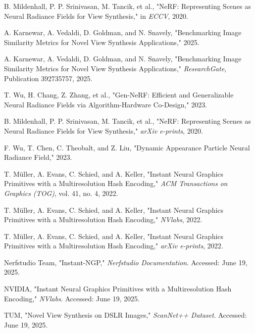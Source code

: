 \documentclass[11pt]{article}
\begin{document}
\newpage
\begin{thebibliography}{99}

B. Mildenhall, P. P. Srinivasan, M. Tancik, et al., "NeRF: Representing Scenes as Neural Radiance Fields for View Synthesis," in \textit{ECCV}, 2020.

A. Karnewar, A. Vedaldi, D. Goldman, and N. Snavely, "Benchmarking Image Similarity Metrics for Novel View Synthesis Applications," 2025.

A. Karnewar, A. Vedaldi, D. Goldman, and N. Snavely, "Benchmarking Image Similarity Metrics for Novel View Synthesis Applications," \textit{ResearchGate}, Publication 392735757, 2025.

T. Wu, H. Chang, Z. Zhang, et al., "Gen-NeRF: Efficient and Generalizable Neural Radiance Fields via Algorithm-Hardware Co-Design," 2023. 

B. Mildenhall, P. P. Srinivasan, M. Tancik, et al., "NeRF: Representing Scenes as Neural Radiance Fields for View Synthesis," \textit{arXiv e-prints}, 2020.

F. Wu, T. Chen, C. Theobalt, and Z. Liu, "Dynamic Appearance Particle Neural Radiance Field," 2023.

T. Müller, A. Evans, C. Schied, and A. Keller, "Instant Neural Graphics Primitives with a Multiresolution Hash Encoding," \textit{ACM Transactions on Graphics (TOG)}, vol. 41, no. 4, 2022.

T. Müller, A. Evans, C. Schied, and A. Keller, "Instant Neural Graphics Primitives with a Multiresolution Hash Encoding," \textit{NVlabs}, 2022.

T. Müller, A. Evans, C. Schied, and A. Keller, "Instant Neural Graphics Primitives with a Multiresolution Hash Encoding," \textit{arXiv e-prints}, 2022.

Nerfstudio Team, "Instant-NGP," \textit{Nerfstudio Documentation}. Accessed: June 19, 2025. 

NVIDIA, "Instant Neural Graphics Primitives with a Multiresolution Hash Encoding," \textit{NVlabs}. Accessed: June 19, 2025. 

TUM, "Novel View Synthesis on DSLR Images," \textit{ScanNet++ Dataset}. Accessed: June 19, 2025.


\end{thebibliography}
\end{document}
